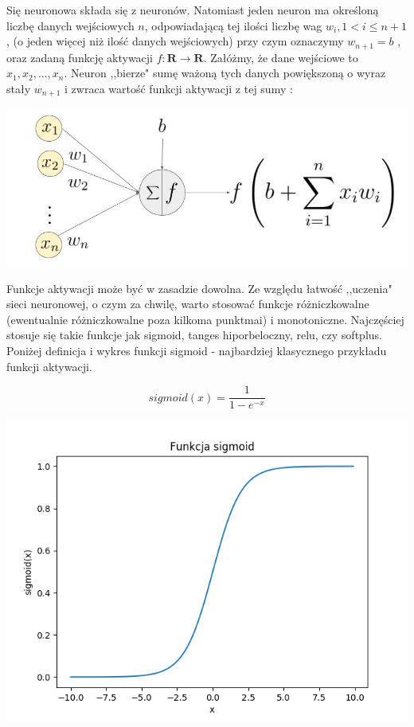 \documentclass[licencjacka]{pracamgr}
\begin{document}
Się neuronowa składa się z neuronów. Natomiast jeden neuron ma określoną liczbę danych wejściowych $n$, odpowiadającą tej ilości liczbę wag $w_{i}, 1 < i\leq n+1$, (o jeden więcej niż ilość danych wejściowych) przy czym oznaczymy $w_{n+1}=b$ , oraz zadaną funkcję aktywacji $f:\mathbf{R}\rightarrow\mathbf{R}$.  Załóżmy, że dane wejściowe to $x_{1}, x_{2},...,x_{n}$.  Neuron ,,bierze" sumę ważoną tych danych powiększoną o wyraz stały $w_{n+1}$ i zwraca wartość funkcji aktywacji z tej sumy :

\begin{flushleft}
	\includegraphics [scale=0.2]{neuron.png}
\end{flushleft}


Funkcje aktywacji może być w zasadzie dowolna. Ze względu łatwość ,,uczenia" sieci neuronowej, o czym za chwilę, warto stosować funkcje różniczkowalne (ewentualnie różniczkowalne poza kilkoma punktmai) i monotoniczne. Najczęściej stosuje się takie funkcje jak sigmoid, tanges hiporbeloczny, relu, czy softplus.  Poniżej definicja i wykres funkcji sigmoid - najbardziej klasycznego przykładu funkcji aktywacji.

$$sigmoid(x) = \frac{1}{1-e^{-x}}$$
\begin{flushleft}
	\includegraphics [scale=0.5]{sigmoid.png}
\end{flushleft}
\end{document}
